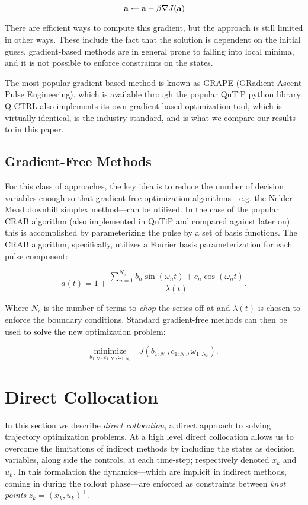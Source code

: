 \documentclass{article}
\newcommand{\minimize}[1]{\underset{#1}{\text{minimize}}}
\begin{document}
\begin{equation}
  \vb{a} \leftarrow \vb{a} - \beta \nabla J(\vb{a})
\end{equation}

There are efficient ways to compute this gradient, but the approach is still limited in other ways.  These include the fact that the solution is dependent on the initial guess, gradient-based methods are in general prone to falling into local minima, and it is not possible to enforce constraints on the states.

The most popular gradient-based method is known as GRAPE (GRadient Ascent Pulse Engineering), which is available through the popular QuTiP python library.  Q-CTRL also implements its own gradient-based optimization tool, which is virtually identical, is the industry standard, and is what we compare our results to in this paper.

\subsection{Gradient-Free Methods}
For this class of approaches, the key idea is to reduce the number of decision variables enough so that gradient-free optimization algorithms---e.g. the Nelder-Mead downhill simplex method---can be utilized. In the case of the popular CRAB algorithm (also implemented in QuTiP and compared against later on) this is accomplished by parameterizing the pulse by a set of basis functions.  The CRAB algorithm, specifically, utilizes a Fourier basis parameterization for each pulse component:

\begin{equation}
  a(t) = 1 + \frac{\sum_{n=1}^{N_c} b_n \sin(\omega_n t) + c_n \cos(\omega_n t)}{\lambda(t)}.
\end{equation}

\noindent
Where $N_c$ is the number of terms to \textit{chop} the series off at and $\lambda(t)$ is chosen to enforce the boundary conditions. Standard gradient-free methods can then be used to solve the new optimization problem:

\begin{equation}
  \minimize{b_{1:N_c}, c_{1:N_c}, \omega_{1:N_c}} \quad J(b_{1:N_c}, c_{1:N_c}, \omega_{1:N_c}).
\end{equation}
  


\newpage
\section{Direct Collocation}
In this section we describe \textit{direct collocation}, a direct approach to solving trajectory optimization problems.  At a high level direct collocation allows us to overcome the limitations of indirect methods by including the states as decision variables, along side the controls, at each time-step; respectively denoted $x_k$ and $u_k$.  In this formalation the dynamics---which are implicit in indirect methods, coming in during the rollout phase---are enforced as constraints between \textit{knot points} $z_k = (x_k, u_k)^\top$.  
\end{document}
